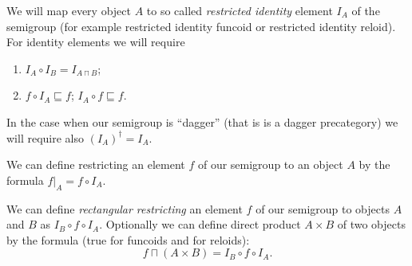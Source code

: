We will map every object $A$ to so called \emph{restricted identity}
element $I_{A}$ of the semigroup (for example restricted identity
funcoid or restricted identity reloid). For identity elements we will
require
\begin{enumerate}
\item $I_{A}\circ I_{B}=I_{A\sqcap B}$;
\item $f\circ I_{A}\sqsubseteq f$; $I_{A}\circ f\sqsubseteq f$.
\end{enumerate}
In the case when our semigroup is ``dagger'' (that is is a dagger
precategory) we will require also $(I_{A})^{\dagger}=I_{A}$.

We can define restricting an element $f$ of our semigroup to an object
$A$ by the formula $f|_{A}=f\circ I_{A}$.

We can define \emph{rectangular restricting}
an element $f$ of our semigroup to objects $A$ and $B$ as $I_{B}\circ f\circ I_{A}$.
Optionally we can define direct product $A\times B$ of two objects
by the formula (true for funcoids and for reloids):
\[
f\sqcap(A\times B)=I_{B}\circ f\circ I_{A}.
\]


